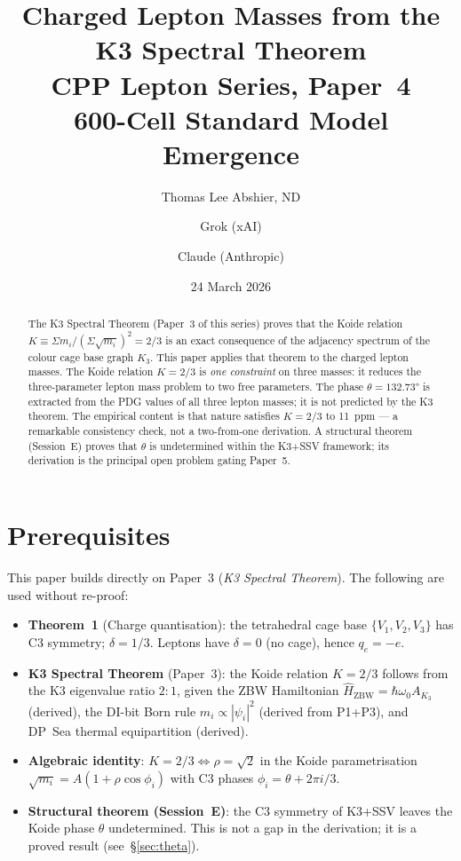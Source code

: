 \documentclass[11pt]{article}
\title{\textbf{Charged Lepton Masses from the K3 Spectral Theorem}\\[6pt]
\large CPP Lepton Series, Paper~4\\[4pt]
\normalsize 600-Cell Standard Model Emergence}
\author{Thomas Lee Abshier, ND \and Grok (xAI) \and Claude (Anthropic)}
\date{24 March 2026}
\newcommand{\ZBW}{\mathrm{ZBW}}
\begin{document}
\maketitle

\begin{abstract}
The K3 Spectral Theorem (Paper~3 of this series) proves that the Koide
relation $K \equiv \Sigma m_i/(\Sigma\sqrt{m_i})^2 = 2/3$ is an exact
consequence of the adjacency spectrum of the colour cage base graph
$K_3$.  This paper applies that theorem to the charged lepton masses.
The Koide relation $K = 2/3$ is \emph{one constraint} on three masses:
it reduces the three-parameter lepton mass problem to two free parameters.
The phase $\theta = 132.73°$ is extracted from the PDG values of all three
lepton masses; it is not predicted by the K3 theorem.
The empirical content is that nature satisfies $K = 2/3$ to 11~ppm ---
a remarkable consistency check, not a two-from-one derivation.
A structural theorem (Session~E) proves that $\theta$ is undetermined
within the K3+SSV framework; its derivation is the principal open problem
gating Paper~5.
\end{abstract}

\section{Prerequisites}

This paper builds directly on Paper~3 (\emph{K3 Spectral Theorem}).
The following are used without re-proof:

\begin{itemize}
\item \textbf{Theorem~1} (Charge quantisation): the tetrahedral cage
  base $\{V_1,V_2,V_3\}$ has C3 symmetry; $\delta = 1/3$.
  Leptons have $\delta = 0$ (no cage), hence $q_e = -e$.

\item \textbf{K3 Spectral Theorem} (Paper~3): the Koide relation
  $K = 2/3$ follows from the K3 eigenvalue ratio $2{:}1$, given
  the ZBW Hamiltonian $\hat{H}_\ZBW = \hbar\omega_0 A_{K_3}$ (derived),
  the DI-bit Born rule $m_i \propto |\psi_i|^2$ (derived from P1+P3),
  and DP~Sea thermal equipartition (derived).

\item \textbf{Algebraic identity}: $K = 2/3 \Leftrightarrow \rho = \sqrt{2}$
  in the Koide parametrisation $\sqrt{m_i} = A(1+\rho\cos\phi_i)$
  with C3 phases $\phi_i = \theta + 2\pi i/3$.

\item \textbf{Structural theorem (Session~E)}: the C3 symmetry of
  K3+SSV leaves the Koide phase $\theta$ undetermined.  This is not
  a gap in the derivation; it is a proved result (see~\S\ref{sec:theta}).
\end{itemize}
\end{document}

